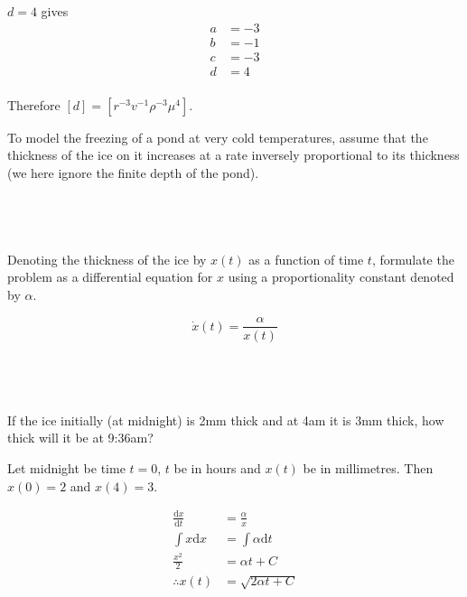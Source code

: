 \documentclass[a4paper]{article}
\begin{document}
$d=4$ gives \begin{align*}
	a &= -3\\
	b &= -1\\
	c &= -3\\
	d &= 4\\
\end{align*}

Therefore $[d] = \left[ r^{-3} v^{-1} \rho^{-3} \mu^4 \right]$.


\begin{questionbody}
To model the freezing of a pond at very cold temperatures, assume that the thickness of the ice on it increases at a rate inversely proportional to its thickness (we here ignore the finite depth of the pond).
\end{questionbody}

\subsection{~} %

\begin{questionbody}
Denoting the thickness of the ice by $x(t)$ as a function of time $t$, formulate the problem as a differential equation for $x$ using a proportionality constant denoted by $\alpha$.
\end{questionbody}

$$\dot x(t) = \frac{\alpha}{x(t)}$$

\subsection{~} %

\begin{questionbody}
If the ice initially (at midnight) is 2mm thick and at 4am it is 3mm thick, how thick will it be at 9:36am?
\end{questionbody}

Let midnight be time $t = 0$, $t$ be in hours and $x(t)$ be in millimetres. Then $x(0) = 2$ and $x(4) = 3$.

\begin{align*}
	\frac{\mathrm d x}{\mathrm d t} &= \frac{\alpha}{x}\\
	\int x \mathrm d x              &= \int \alpha \mathrm d t\\
	\frac{x^2}{2}                   &= \alpha t + C\\
	\therefore x(t)                 &= \sqrt{2\alpha t + C}
\end{align*}
\end{document}
